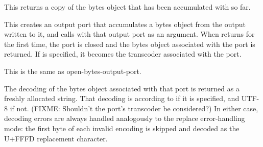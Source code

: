 \begin{entry}{%
}

This returns a copy of the bytes object that has been accumulated with
 so far.
\end{entry}

\begin{entry}{%
}

 This
creates an output port that accumulates a bytes object from the output
written to it, and calls  with that output port as an
argument. When  returns for the first time, the port is
closed and the bytes object associated with the port is returned.  If
 is specified, it becomes the transcoder associated
with the port.
\end{entry}

\begin{entry}{%
}

This is the same as {\cf open-bytes-output-port}.
\end{entry}

\begin{entry}{%
}

The decoding of the bytes object associated with that port is returned
as a freshly allocated string.  That decoding is according to
 if it is specified, and UTF-8 if not.
(FIXME: Shouldn't the port's transcoder be considered?)
In either
case, decoding errors are always handled analogously to the {\cf
  replace} error-handling mode: the first byte of each invalid
encoding is skipped and decoded as the U+FFFD replacement character.
\end{entry}

